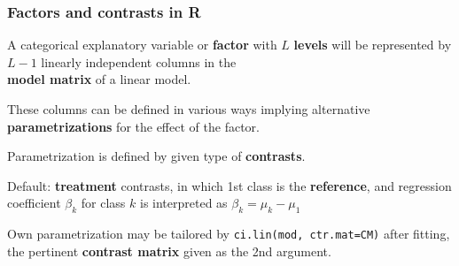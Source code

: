 \documentclass[12pt,dvipsnames,t,handout%
,aspectratio=169%
]{beamer}
\begin{document}
\begin{frame}
\frametitle{Factors and contrasts in R}

\bi
\item
A categorical explanatory variable or {\bf factor}  
with $L$ {\bf levels} will be represented by $L-1$ linearly independent
columns in the \\ {\bf model matrix} of a linear model. 
\medskip
\item
These columns can be defined in various ways implying
alternative {\bf parametrizations} for the effect of the factor.
\medskip
\item 
Parametrization is defined by given type of {\bf contrasts}. 
\medskip
\item 
Default: {\bf treatment} contrasts, in which 1st class is the {\bf reference}, 
and regression coefficient $\beta_k$ for class $k$ is interpreted as $\beta_k = \mu_k - \mu_1$
\medskip
\item
Own parametrization may be tailored by   
{\tt ci.lin(mod, ctr.mat=CM)} after fitting,
 the pertinent {\bf contrast matrix} given as the 2nd argument.  
\ei
\end{frame}
\end{document}
